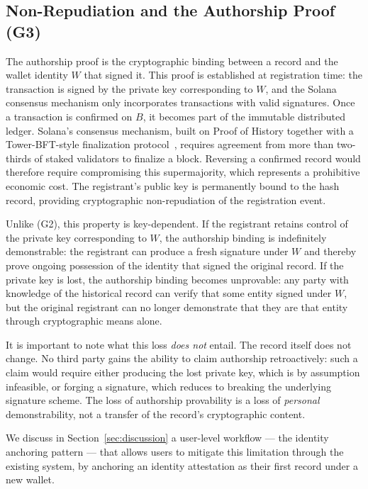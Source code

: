 \documentclass[11pt,a4paper]{article}
\begin{document}
\subsection{Non-Repudiation and the Authorship Proof (G3)}
\label{sec:security:nonrep}

The authorship proof is the cryptographic binding between a record and
the wallet identity $W$ that signed it. This proof is established at
registration time: the transaction is signed by the private key
corresponding to $W$, and the Solana consensus mechanism only
incorporates transactions with valid signatures. Once a transaction is
confirmed on $B$, it becomes part of the immutable distributed ledger.
Solana's consensus mechanism, built on Proof of History together with
a Tower-BFT-style finalization protocol~\cite{yakovenko2018solana},
requires agreement from more than two-thirds of staked validators to
finalize a block. Reversing a confirmed record would therefore require
compromising this supermajority, which represents a prohibitive
economic cost. The registrant's public key is permanently bound to the
hash record, providing cryptographic non-repudiation of the
registration event.

Unlike (G2), this property is key-dependent. If the registrant retains
control of the private key corresponding to $W$, the authorship binding
is indefinitely demonstrable: the registrant can produce a fresh
signature under $W$ and thereby prove ongoing possession of the
identity that signed the original record. If the private key is lost,
the authorship binding becomes unprovable: any party with knowledge of
the historical record can verify that some entity signed under $W$,
but the original registrant can no longer demonstrate that they are
that entity through cryptographic means alone.

It is important to note what this loss \emph{does not} entail. The
record itself does not change. No third party gains the ability to
claim authorship retroactively: such a claim would require either
producing the lost private key, which is by assumption infeasible, or
forging a signature, which reduces to breaking the underlying signature
scheme. The loss of authorship provability is a loss of \emph{personal}
demonstrability, not a transfer of the record's cryptographic content.

We discuss in Section~\ref{sec:discussion} a user-level workflow ---
the identity anchoring pattern --- that allows users to mitigate this
limitation through the existing system, by anchoring an identity
attestation as their first record under a new wallet.
\end{document}
